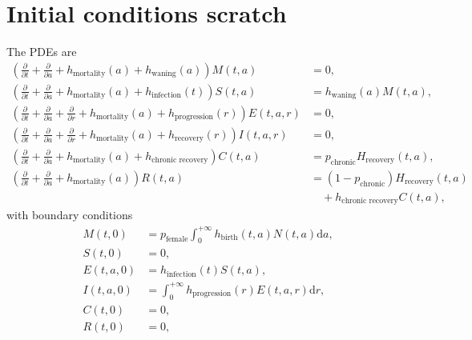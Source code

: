 \documentclass[12pt]{article}
\newcommand{\md}{\mathrm{d}}
\begin{document}
\section{Initial conditions scratch}

The PDEs are
\begin{equation}
  \begin{split}
    \left(
      \frac{\partial}{\partial t}
      + \frac{\partial}{\partial a}
      + h_{\text{mortality}}(a)
      + h_{\text{waning}}(a)
    \right) M(t, a)
    &= 0,
    \\
    \left(
      \frac{\partial}{\partial t}
      + \frac{\partial}{\partial a}
      + h_{\text{mortality}}(a)
      + h_{\text{infection}}(t)
    \right) S(t, a)
    &= h_{\text{waning}}(a) M(t, a),
    \\
    \left(
      \frac{\partial}{\partial t}
      + \frac{\partial}{\partial a}
      + \frac{\partial}{\partial r}
      + h_{\text{mortality}}(a)
      + h_{\text{progression}}(r)
    \right) E(t, a, r)
    &= 0,
    \\
    \left(
      \frac{\partial}{\partial t}
      + \frac{\partial}{\partial a}
      + \frac{\partial}{\partial r}
      + h_{\text{mortality}}(a)
      + h_{\text{recovery}}(r)
    \right) I(t, a, r)
    &= 0,
    \\
    \left(
      \frac{\partial}{\partial t}
      + \frac{\partial}{\partial a}
      + h_{\text{mortality}}(a)
      + h_{\text{chronic recovery}}
    \right) C(t, a)
    &= p_{\text{chronic}} H_{\text{recovery}}(t, a),
    \\
    \left(
      \frac{\partial}{\partial t}
      + \frac{\partial}{\partial a}
      + h_{\text{mortality}}(a)
    \right) R(t, a)
    &= (1 - p_{\text{chronic}}) H_{\text{recovery}}(t, a)
    \\ & \quad {}
    + h_{\text{chronic recovery}} C(t, a),
  \end{split}
\end{equation}
with boundary conditions
\begin{equation}
  \begin{split}
    M(t, 0)
    &= p_{\text{female}}
    \int_0^{+\infty} h_{\text{birth}}(t, a) N(t, a) \md a,
    \\
    S(t, 0) &= 0,
    \\
    E(t, a, 0)
    &= h_{\text{infection}}(t) S(t, a),
    \\
    I(t, a, 0)
    &= \int_0^{+\infty}h_{\text{progression}}(r) E(t, a, r) \md r,
    \\
    C(t, 0) &= 0,
    \\
    R(t, 0) &= 0,
  \end{split}
\end{equation}
\end{document}

